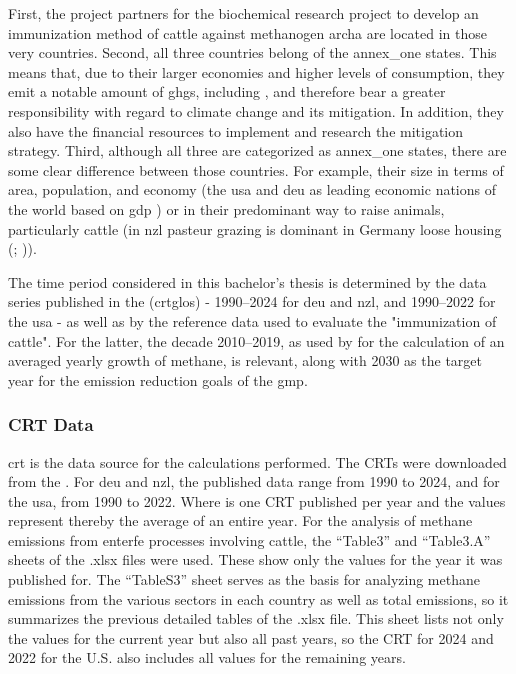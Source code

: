 First, the project partners for the biochemical research project to develop an immunization method of cattle against methanogen \gls{archa} are located in those very countries.
Second, all three countries belong of the \gls{annex_one} states. This means that, due to their larger economies and higher levels of consumption, they emit a notable amount of \acrshort{ghg}s, including , and therefore bear a greater responsibility with regard to climate change and its mitigation. In addition, they also have the financial resources to implement and research the mitigation strategy.
Third, although all three are categorized as \gls{annex_one} states, there are some clear difference between those countries. For example, their size in terms of area, population, and economy (the \acrshort{usa} and \acrshort{deu} as leading economic nations of the world based on \acrshort{gdp} \citep{internationalmoneytaryfundWorldEconomicOutlook}) or in their predominant way to raise animals, particularly cattle (in \acrshort{nzl} pasteur grazing is dominant in Germany loose housing (\citealp[p.\,155]{NZL_GHG_REPORT_CRT}; \citealp[Table 510]{Ger_Report_GHG})).

The time period considered in this bachelor's thesis is determined by the data series published in the  (\gls{crtglo}s) - 1990--2024 for \acrshort{deu} and \acrshort{nzl}, and 1990--2022 for the \acrshort{usa} - as well as by the reference data used to evaluate the "immunization of cattle". For the latter, the decade 2010--2019, as used by \citet{saunoisGlobalMethaneBudget2025} for the calculation of an averaged yearly growth of methane, is relevant, along with 2030 as the target year for the emission reduction goals of the \acrshort{gmp}.

\subsubsection{CRT Data}
\label{sec:data_sources}

\Acrshort{crt} is the data source for the calculations performed. The CRTs were downloaded from the \citet{CommonReportingTables}.
For \acrshort{deu} and \acrshort{nzl}, the published data range from 1990 to 2024, and for the \acrshort{usa}, from 1990 to 2022. Where is one CRT published per year and the values represent thereby the average of an entire year. 
For the analysis of methane emissions from \acrlong{enterfe} processes involving cattle, the “Table3” and “Table3.A” sheets of the .xlsx files were used. These show only the values for the year it was published for.
The “TableS3” sheet serves as the basis for analyzing methane emissions from the various sectors in each country as well as total emissions, so it summarizes the previous detailed tables of the .xlsx file. This sheet lists not only the values for the current year but also all past years, so the CRT for 2024 and 2022 for the U.S. also includes all values for the remaining years.

